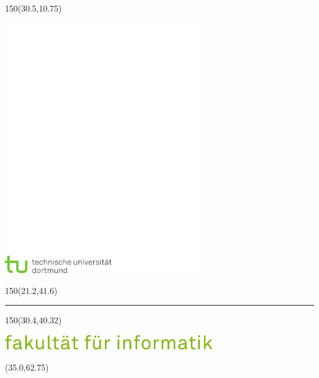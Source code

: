 
\begin{titlepage}

\begin{textblock}{150}(30.5,10.75)%
\raggedright
\includegraphics[width=83.25mm]{bilder/tud_logo_cmyk.pdf}%
\end{textblock}

\begin{textblock}{150}(21.2,41.6)%
\raggedright\sf%
{\color{red}\rule{5mm}{5mm}}
\end{textblock}

\begin{textblock}{150}(30.4,40.32)%
\raggedright
\includegraphics[width=90mm]{bilder/fi_text.pdf}
\end{textblock}

\begin{textblock}{89}(35.0,62.75)%
\begin{minipage}{80mm}
	\vfill
	\begin{center}
	\fontsize{24pt}{24pt} \sf
	\Arbeitsbezeichnung
	
	\vspace{1cm}
	\begin{onehalfspace}
    \fontsize{18pt}{18pt}
    \sf \Arbeitstitel
    \end{onehalfspace}
	

\end{center}
\end{minipage}
\end{textblock}
\end{titlepage}
